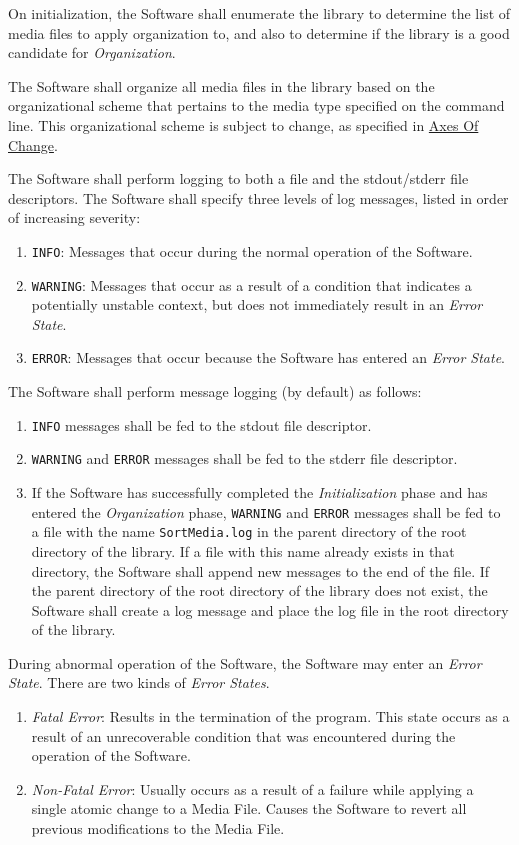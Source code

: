 \documentclass{designdoc}
\begin{document}
On initialization, the Software shall enumerate the library to determine the
list of media files to apply organization to, and also to determine if the
library is a good candidate for \textit{Organization}.

The Software shall organize all media files in the library based on the
organizational scheme that pertains to the media type specified on the command
line. This organizational scheme is subject to change, as specified in
\hyperlink{sec:axesOfChange}{Axes Of Change}.

The Software shall perform logging to both a file and the stdout/stderr file
descriptors. The Software shall specify three levels of log messages, listed
in order of increasing severity:
\begin{enumerate}
\item \texttt{INFO}: Messages that occur during the normal operation of the
  Software.
\item \texttt{WARNING}: Messages that occur as a result of a condition that
  indicates a potentially unstable context, but does not immediately result
  in an \textit{Error State}.
\item \texttt{ERROR}: Messages that occur because the Software has entered an
  \textit{Error State}.
\end{enumerate}
The Software shall perform message logging (by default) as follows:
\begin{enumerate}
\item \texttt{INFO} messages shall be fed to the stdout file descriptor.
\item \texttt{WARNING} and \texttt{ERROR} messages shall be fed to the stderr
  file descriptor.
\item If the Software has successfully completed the \textit{Initialization}
  phase and has entered the \textit{Organization} phase, \texttt{WARNING} and
  \texttt{ERROR} messages shall be fed to a file with the name
  \texttt{SortMedia.log} in the parent directory of the root directory of the
  library. If a file with this name already exists in that directory, the
  Software shall append new messages to the end of the file. If the parent
  directory of the root directory of the library does not exist, the Software
  shall create a log message and place the log file in the root directory of
  the library.
\end{enumerate}

During abnormal operation of the Software, the Software may enter an
\textit{Error State}. There are two kinds of \textit{Error States}.
\begin{enumerate}
\item \textit{Fatal Error}: Results in the termination of the program. This
  state occurs as a result of an unrecoverable condition that was encountered
  during the operation of the Software.
\item \textit{Non-Fatal Error}: Usually occurs as a result of a failure while
  applying a single atomic change to a Media File. Causes the Software to
  revert all previous modifications to the Media File.
\end{enumerate}
\end{document}
